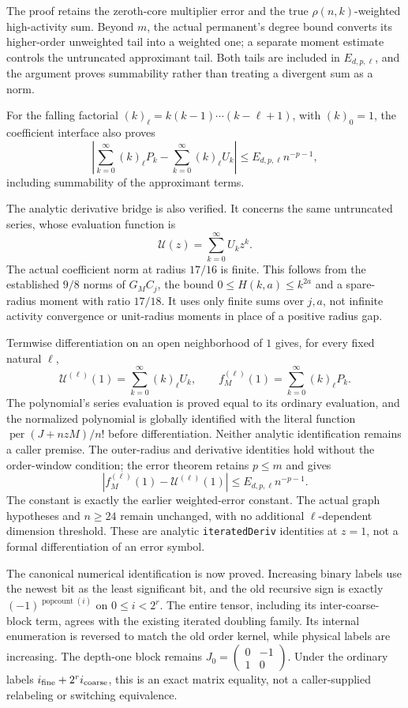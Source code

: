 \documentclass[11pt]{article}
\begin{document}
The proof retains the zeroth-core multiplier error and the true $\rho(n,k)$-weighted high-activity sum. Beyond $m$, the actual permanent's degree bound converts its higher-order unweighted tail into a weighted one; a separate moment estimate controls the untruncated approximant tail. Both tails are included in $E_{d,p,\ell}$, and the argument proves summability rather than treating a divergent sum as a norm.

For the falling factorial $(k)_\ell=k(k-1)\cdots(k-\ell+1)$, with $(k)_0=1$, the coefficient interface also proves
\[
 \left|\sum_{k=0}^{\infty}(k)_\ell P_k
       -\sum_{k=0}^{\infty}(k)_\ell U_k\right|
 \le E_{d,p,\ell}n^{-p-1},
\]
including summability of the approximant terms.

The analytic derivative bridge is also verified. It concerns the same untruncated series, whose evaluation function is
\[
 \mathcal U(z)=\sum_{k=0}^{\infty}U_kz^k.
\]
The actual coefficient norm at radius $17/16$ is finite. This follows from the established $9/8$ norms of $G_MC_j$, the bound $0\le H(k,a)\le k^{2a}$ and a spare-radius moment with ratio $17/18$. It uses only finite sums over $j,a$, not infinite activity convergence or unit-radius moments in place of a positive radius gap.

Termwise differentiation on an open neighborhood of $1$ gives, for every fixed natural $\ell$,
\[
 \mathcal U^{(\ell)}(1)=\sum_{k=0}^{\infty}(k)_\ell U_k,
 \qquad f_M^{(\ell)}(1)=\sum_{k=0}^{\infty}(k)_\ell P_k.
\]
The polynomial's series evaluation is proved equal to its ordinary evaluation, and the normalized polynomial is globally identified with the literal function $\operatorname{per}(J+nzM)/n!$ before differentiation. Neither analytic identification remains a caller premise. The outer-radius and derivative identities hold without the order-window condition; the error theorem retains $p\le m$ and gives
\[
 \left|f_M^{(\ell)}(1)-\mathcal U^{(\ell)}(1)\right|
 \le E_{d,p,\ell}n^{-p-1}.
\]
The constant is exactly the earlier weighted-error constant. The actual graph hypotheses and $n\ge24$ remain unchanged, with no additional $\ell$-dependent dimension threshold. These are analytic \texttt{iteratedDeriv} identities at $z=1$, not a formal differentiation of an error symbol.

The canonical numerical identification is now proved. Increasing binary labels use the newest bit as the least significant bit, and the old recursive sign is exactly $(-1)^{\operatorname{popcount}(i)}$ on $0\le i<2^r$. The entire tensor, including its inter-coarse-block term, agrees with the existing iterated doubling family. Its internal enumeration is reversed to match the old order kernel, while physical labels are increasing. The depth-one block remains $J_0=\left(\begin{smallmatrix}0&-1\\1&0\end{smallmatrix}\right)$. Under the ordinary labels $i_{\rm fine}+2^r i_{\rm coarse}$, this is an exact matrix equality, not a caller-supplied relabeling or switching equivalence.
\end{document}
